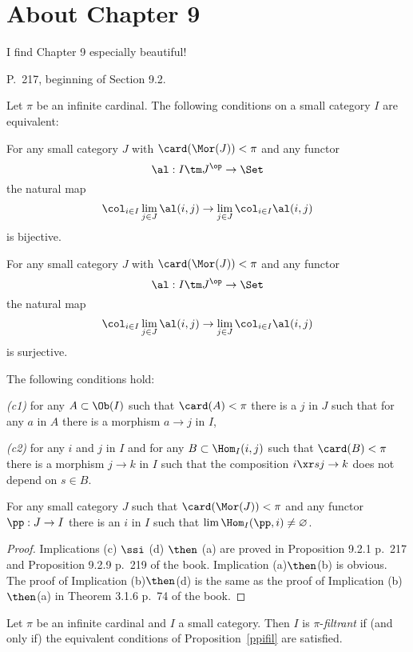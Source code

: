 \documentclass[12pt]{article}
\theoremstyle{remark}
\theoremstyle{definition}
\begin{document}

\section{About Chapter 9}

I find Chapter 9 especially beautiful!


\begin{s}
P.~217, beginning of Section 9.2. 

\begin{prop}
Let $\pi$ be an infinite cardinal. The following conditions on a small category $I$ are equivalent:

 For any small category $J$ with $\card(\Mor(J))<\pi$ and any functor 
$$
\al:I\tm J^{\op}\to\Set
$$ 
the natural map 
$$
\col_{i\in I}\lim_{j\in J}\al(i,j)\to\lim_{j\in J}\col_{i\in I}\al(i,j)
$$ 
is bijective.

 For any small category $J$ with $\card(\Mor(J))<\pi$ and any functor 
$$
\al:I\tm J^{\op}\to\Set
$$ 
the natural map 
$$
\col_{i\in I}\lim_{j\in J}\al(i,j)\to\lim_{j\in J}\col_{i\in I}\al(i,j)
$$ 
is surjective.

 The following conditions hold:

{\em(c1)} for any $A\subset\Ob(I)$ such that $\card(A)<\pi$ there is a $j$ in $J$ such that for any $a$ in $A$ there is a morphism $a\to j$ in $I$,

{\em(c2)} for any $i$ and $j$ in $I$ and for any $B\subset\Hom_I(i,j)$ such that $\card(B)<\pi$ there is a morphism $j\to k$ in $I$ such that the composition $i\xr sj\to k$ does not depend on $s\in B$.

 For any small category $J$ such that $\card(\Mor(J))<\pi$ and any functor $\pp:J\to I$ there is an $i$ in $I$ such that $\lim\Hom_I(\pp,i)\neq\varnothing$. 
\end{prop}

\begin{proof}
Implications (c) $\ssi$ (d) $\then$ (a) are proved in Proposition 9.2.1 p.~217 and Proposition 9.2.9 p.~219 of the book. Implication (a)$\then$(b) is obvious. The proof of Implication (b)$\then$(d) is the same as the proof of Implication (b)$\then$(a) in Theorem 3.1.6 p.~74 of the book.
\end{proof}

\begin{df} 
Let $\pi$ be an infinite cardinal and $I$ a small category. Then $I$ is $\pi$-{\em filtrant} if (and only if) the equivalent conditions of Proposition~\ref{ppifil} are satisfied.
\end{df}
\end{s}
\end{document}
